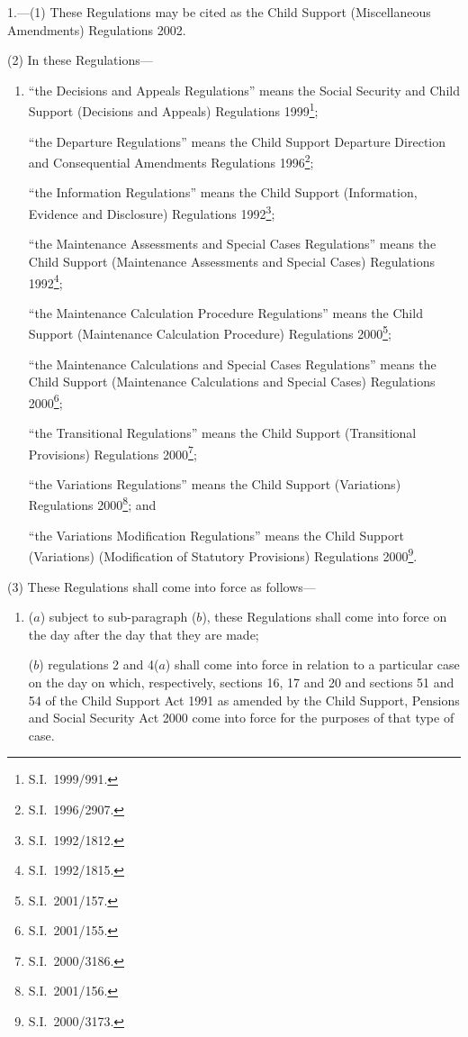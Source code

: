 \documentclass[12pt,a4paper]{article}
\begin{document}
1.---(1)  These Regulations may be cited as the Child Support (Miscellaneous Amendments) Regulations 2002.

(2) In these Regulations—
\begin{enumerate}\item[]
“the Decisions and Appeals Regulations” means the Social Security and Child Support (Decisions and Appeals) Regulations 1999\footnote{S.I.\ 1999/991.};

“the Departure Regulations” means the Child Support Departure Direction and Consequential Amendments Regulations 1996\footnote{S.I.\ 1996/2907.};

“the Information Regulations” means the Child Support (Information, Evidence and Disclosure) Regulations 1992\footnote{S.I.\ 1992/1812.};

“the Maintenance Assessments and Special Cases Regulations” means the Child Support (Maintenance Assessments and Special Cases) Regulations 1992\footnote{S.I.\ 1992/1815.};

“the Maintenance Calculation Procedure Regulations” means the Child Support (Maintenance Calculation Procedure) Regulations 2000\footnote{S.I.\ 2001/157.};

“the Maintenance Calculations and Special Cases Regulations” means the Child Support (Maintenance Calculations and Special Cases) Regulations 2000\footnote{S.I.\ 2001/155.};

“the Transitional Regulations” means the Child Support (Transitional Provisions) Regulations 2000\footnote{S.I.\ 2000/3186.};

“the Variations Regulations” means the Child Support (Variations) Regulations 2000\footnote{S.I.\ 2001/156.}; and

“the Variations Modification Regulations” means the Child Support (Variations) (Modification of Statutory Provisions) Regulations 2000\footnote{S.I.\ 2000/3173.}.
\end{enumerate}

(3) These Regulations shall come into force as follows—
\begin{enumerate}\item[]
($a$) subject to sub-paragraph ($b$), these Regulations shall come into force on the day after the day that they are made;

($b$) regulations 2 and 4($a$)  shall come into force in relation to a particular case on the day on which, respectively, sections 16, 17 and 20 and sections 51 and 54 of the Child Support Act 1991 as amended by the Child Support, Pensions and Social Security Act 2000 come into force for the purposes of that type of case.
\end{enumerate}
\end{document}
